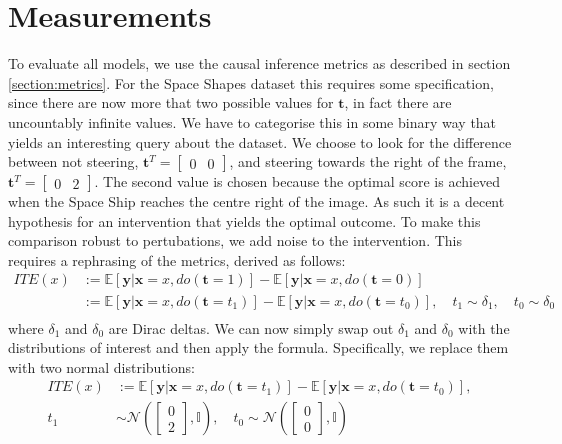 \documentclass{report}
\newcommand{\E}{\mathbb{E}}
\newcommand{\eye}{\mathbb{I}}
\newcommand{\Norm}{\mathcal{N}}
\newcommand{\bt}{\mathbf{t}}
\newcommand{\bx}{\mathbf{x}}
\newcommand{\by}{\mathbf{y}}
\begin{document}
\section{Measurements}
To evaluate all models, we use the causal inference metrics as described in section \ref{section:metrics}. For the Space Shapes dataset this requires some specification, since there are now more that two possible values for $\bt$, in fact there are uncountably infinite values. We have to categorise this in some binary way that yields an interesting query about the dataset. We choose to look for the difference between not steering, $\bt^T = \begin{bmatrix} 0&0\end{bmatrix}$, and steering towards the right of the frame, $\bt^T = \begin{bmatrix} 0&2\end{bmatrix}$. The second value is chosen because the optimal score is achieved when the Space Ship reaches the centre right of the image. As such it is a decent hypothesis for an intervention that yields the optimal outcome. To make this comparison robust to pertubations, we add noise to the intervention. This requires a rephrasing of the metrics, derived as follows:
\begin{equation}
    \begin{split}
    ITE(x) &:= \E[\by | \bx=x, do(\bt=1)] - \E[\by | \bx=x, do(\bt=0)]\\
    &:= \E[\by | \bx=x, do(\bt=t_1)] - \E[\by | \bx=x, do(\bt=t_0)], \quad t_1 \sim \delta_1, \quad t_0 \sim \delta_0\\
    \end{split}
\end{equation}
where $\delta_1$ and $\delta_0$ are Dirac deltas. We can now simply swap out $\delta_1$ and $\delta_0$ with the distributions of interest and then apply the formula. Specifically, we replace them with two normal distributions:
\begin{equation}
    \begin{split}
    ITE(x) &:= \E[\by | \bx=x, do(\bt=t_1)] - \E[\by | \bx=x, do(\bt=t_0)], \\
    t_1 &\sim \Norm\left(\begin{bmatrix}0 \\ 2\end{bmatrix}, \eye\right), \quad t_0 \sim \Norm\left(\begin{bmatrix}0 \\ 0\end{bmatrix}, \eye\right)
    \end{split}
\end{equation}
\end{document}
